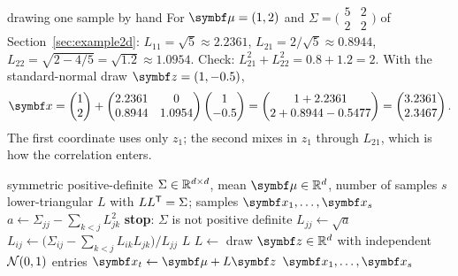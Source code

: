 \documentclass[11pt]{article}
\begin{document}
\begin{worked}{drawing one sample by hand}
For $\vmu = (1, 2)$ and $\Sigma = \bigl(\begin{smallmatrix} 5 & 2 \\ 2 & 2\end{smallmatrix}\bigr)$ of Section~\ref{sec:example2d}: $L_{11} = \sqrt5 \approx
2.2361$, $L_{21} = 2/\sqrt5 \approx 0.8944$, $L_{22} = \sqrt{2 - 4/5} = \sqrt{1.2} \approx 1.0954$. Check:
$L_{21}^2 + L_{22}^2 = 0.8 + 1.2 = 2$. With the standard-normal draw $\vect{z} = (1, -0.5)$,
\[
  \x = \begin{pmatrix} 1 \\ 2 \end{pmatrix} + \begin{pmatrix} 2.2361 & 0 \\ 0.8944 & 1.0954 \end{pmatrix}
  \begin{pmatrix} 1 \\ -0.5 \end{pmatrix}
  = \begin{pmatrix} 1 + 2.2361 \\ 2 + 0.8944 - 0.5477 \end{pmatrix} = \begin{pmatrix} 3.2361 \\ 2.3467 \end{pmatrix}.
\]
The first coordinate uses only $z_1$; the second mixes in $z_1$ through $L_{21}$, which is how the correlation
enters.
\end{worked}

\begin{algorithm}[htbp]
\caption{Cholesky factorisation and sampling from $\Normal(\vmu, \Sigma)$}\label{alg:gausssample}
\begin{algorithmic}[1]
\Require symmetric positive-definite $\Sigma \in \mathbb{R}^{d \times d}$, mean $\vmu \in \R^d$, number of samples $s$
\Ensure lower-triangular $L$ with $LL^{\mathsf{T}} = \Sigma$; samples $\x_1, \dots, \x_s$
    \State $a \gets \Sigma_{jj} - \sum_{k<j} L_{jk}^2$
     \textbf{stop}: $\Sigma$ is not positive definite \EndIf
    \State $L_{jj} \gets \sqrt{a}$
      \State $L_{ij} \gets \big(\Sigma_{ij} - \sum_{k<j} L_{ik}L_{jk}\big) / L_{jj}$
    \EndFor
  \EndFor
  \State \Return $L$ 
\EndFunction
{}
  \State $L \gets$  
    \State draw $\vect{z} \in \R^d$ with independent $\mathcal{N}(0, 1)$ entries
    \State $\x_t \gets \vmu + L\vect{z}$ 
  \EndFor
  \State \Return $\x_1, \dots, \x_s$
\EndFunction
\end{algorithmic}
\end{algorithm}
\end{document}
